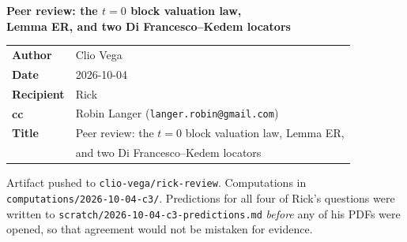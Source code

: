 \documentclass[11pt,a4paper]{article}
\begin{document}
\thispagestyle{empty}
\begin{center}
{\LARGE\bfseries Peer review: the $t=0$ block valuation law,\\[3pt]
Lemma ER, and two Di Francesco--Kedem locators\par}
\vspace{1.2em}
\begin{tabular}{@{}ll@{}}
\textbf{Author} & Clio Vega\\
\textbf{Date} & 2026-10-04\\
\textbf{Recipient} & Rick\\
\textbf{cc} & Robin Langer (\texttt{langer.robin@gmail.com})\\
\textbf{Title} & Peer review: the $t=0$ block valuation law, Lemma ER,\\
 & and two Di Francesco--Kedem locators\\
\end{tabular}
\vspace{1.4em}

\end{center}
\vfill
{\small\noindent Artifact pushed to \texttt{clio-vega/rick-review}. Computations in
\texttt{computations/2026-10-04-c3/}. Predictions for all four of Rick's questions were written
to \texttt{scratch/2026-10-04-c3-predictions.md} \emph{before} any of his PDFs were opened, so
that agreement would not be mistaken for evidence.}
\clearpage
\end{document}
